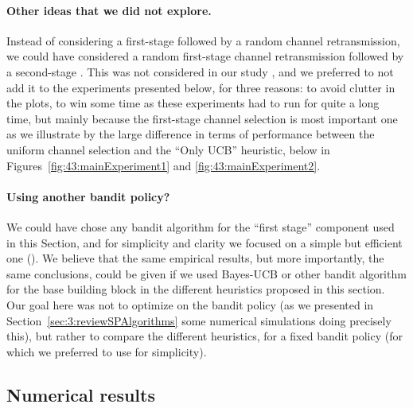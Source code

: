 \paragraph{Other ideas that we did not explore.}
%
Instead of considering a first-stage \UCB{} followed by a random channel retransmission, we could have considered a random first-stage channel retransmission followed by a second-stage \UCB.
This was not considered in our study \cite{Bonnefoi2019WCNC}, and we preferred to not add it to the experiments presented below, for three reasons: to avoid clutter in the plots, to win some time as these experiments had to run for quite a long time, but mainly because the first-stage channel selection is most important one as we illustrate by the large difference in terms of performance between the uniform channel selection and the ``Only UCB'' heuristic, below in Figures~\ref{fig:43:mainExperiment1} and \ref{fig:43:mainExperiment2}.


\paragraph{Using another bandit policy?}
%
We could have chose any bandit algorithm for the ``first stage'' component used in this Section, and for simplicity and clarity we focused on a simple but efficient one (\UCB).
We believe that the same empirical results, but more importantly, the same conclusions, could be given if we used Bayes-UCB or other bandit algorithm for the base building block in the different heuristics proposed in this section.
Our goal here was not to optimize on the bandit policy (as we presented in Section~\ref{sec:3:reviewSPAlgorithms} some numerical simulations doing precisely this), but rather to compare the different heuristics, for a fixed bandit policy (for which we preferred to use \UCB{} for simplicity).


\subsection{Numerical results}
\label{sub:43:numExp}

